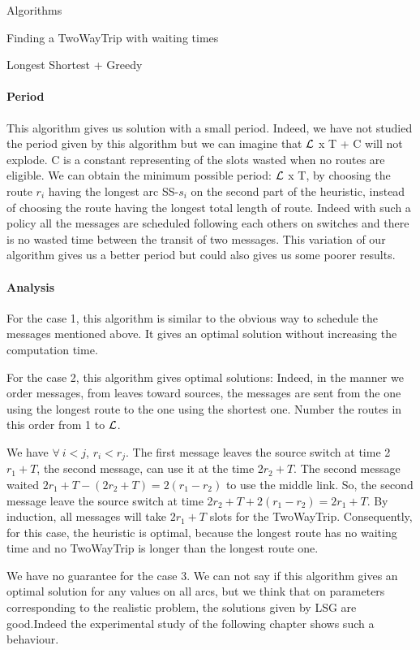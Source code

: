 \documentclass[a4paper,10pt]{report}
\begin{document}
\begin{chapter}{Algorithms}
\begin{section}{Finding a TwoWayTrip with waiting times}
\begin{subsection}{Longest Shortest + Greedy}
\paragraph{Period}
This algorithm gives us solution with a small period. Indeed, we have not studied the period given by this algorithm but we can imagine that ${\cal L}$ x T + C will not explode. C is a constant representing of the slots wasted when no routes are eligible.
We can obtain the minimum possible period: ${\cal L}$ x T, by choosing the route $r_i$ having the longest arc SS-$s_i$ on the second part of the heuristic, instead of choosing the route having the longest total length of route. Indeed with such a policy all the messages are scheduled following each others on switches and there is no wasted time between the transit of two messages.
This variation of our algorithm gives us a better period but could also gives us some poorer results.

\paragraph{Analysis}
For the case 1, this algorithm is similar to the obvious way to schedule the messages mentioned above. It gives an optimal solution without increasing 
the computation time.

For the case 2, this algorithm gives optimal solutions: Indeed, in the manner we order messages, from leaves toward sources,
the messages are sent from the one using the longest route to the one using the shortest one. Number the routes in this order from 1 to ${\cal L}$.

We have $\forall \ i<j$, $r_i<r_j$.
The first message leaves the source switch at time 2$r_1+T$, the second message, can use it at the time 2$r_2+T$.
The second message waited $2r_1+T-(2r_2+T) = 2(r_1-r_2)$ to use the middle link. So, the second message leave the source switch at time
2$r_2+T + 2(r_1-r_2) = 2r_1 +T$.
By induction, all messages will take $2r_1 +T$ slots for the TwoWayTrip.
Consequently, for this case, the heuristic is optimal, because the longest route has no waiting time and no TwoWayTrip is longer than the longest route one.

We have no guarantee for the case 3. We can not say if this algorithm gives an optimal solution for any values on all arcs, but we think that on parameters corresponding to the realistic problem, the solutions given by LSG are good.Indeed the experimental study of the following chapter shows such a behaviour.


\end{subsection}
\end{section}
\end{chapter}
\end{document}

